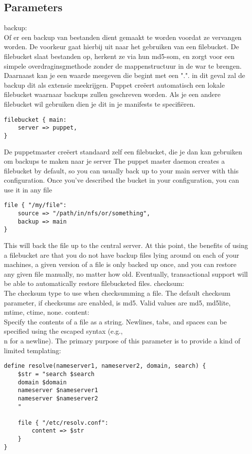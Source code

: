 \subsection{Parameters}
backup:\\
Of er een backup van bestanden dient gemaakt te worden voordat ze vervangen worden. De voorkeur gaat hierbij uit naar het gebruiken van een filebucket.	De filebucket slaat bestanden op, herkent ze via hun md5-som, en zorgt voor een simpele overdraginsgmethode zonder de mappenstructuur in de war te brengen. Daarnaast kan je een waarde meegeven die begint met een ".". in dit geval zal de backup dit als extensie meekrijgen. Puppet cre\"{e}ert automatisch een lokale filebucket waarnaar backups zullen geschreven worden. Als je een andere filebucket wil gebruiken dien je dit in je manifests te specifi\"{e}ren.
\begin{code}
\begin{lstlisting}
filebucket { main:
	server => puppet,
}
\end{lstlisting}
\end{code}
%
De puppetmaster cre\"{e}ert standaard zelf een filebucket, die je dan kan gebruiken om backups te maken naar je server
The puppet master daemon creates a filebucket by default, so you can usually back up to your main server with this configuration. Once you've described the bucket in your configuration, you can use it in any file
%
\begin{code}
\begin{lstlisting}
file { "/my/file":
	source => "/path/in/nfs/or/something",
	backup => main
}
\end{lstlisting}
\end{code}
%
This will back the file up to the central server.
At this point, the benefits of using a filebucket are that you do not have backup files lying around on each of your machines, a given version of a file is only backed up once, and you can restore any given file manually, no matter how old. Eventually, transactional support will be able to automatically restore filebucketed files.
%
checksum:\\
The checksum type to use when checksumming a file.
The default checksum parameter, if checksums are enabled, is md5. Valid values are md5, md5lite, mtime, ctime, none.
%
content:\\
Specify the contents of a file as a string. Newlines, tabs, and spaces can be specified using the escaped syntax (e.g., \\n for a newline). The primary purpose of this parameter is to provide a kind of limited templating:
%
\begin{code}
\begin{lstlisting}
define resolve(nameserver1, nameserver2, domain, search) {
	$str = "search $search
	domain $domain
	nameserver $nameserver1
	nameserver $nameserver2
	"

	file { "/etc/resolv.conf":
		content => $str
	}
}
\end{lstlisting}
\end{code}

